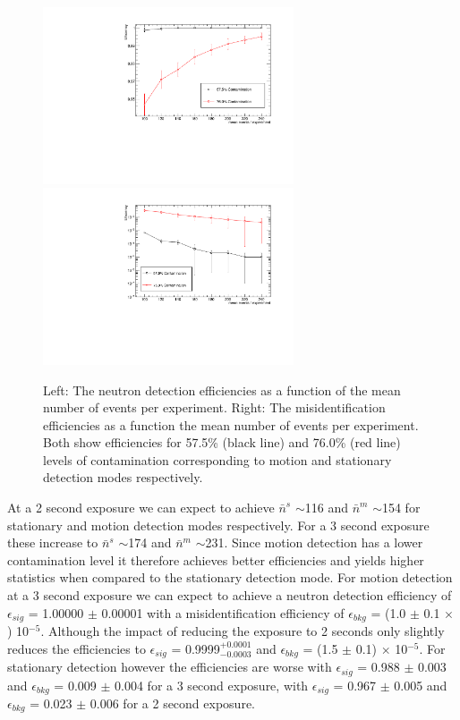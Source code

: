 \begin{figure}[htbp]
\begin{center}
\includegraphics[width=74mm]{Chapter8/figures/efficiencySignal_contaminationLevel_vs_events.pdf}
\includegraphics[width=74mm]{Chapter8/figures/misidentificationRate_contaminationLevel_vs_events.pdf}
\caption{Left: The neutron detection efficiencies as a function of the mean number of events per experiment. Right: The misidentification efficiencies as a function the mean number of events per experiment. Both show efficiencies for 57.5\% (black line) and 76.0\% (red line) levels of contamination corresponding to motion and stationary detection modes respectively.}
\label{fig:modesContaminationEffVsEvents}
\end{center}
\end{figure}

At a 2 second exposure we can expect to achieve $\bar{n}^{s}$ $\sim$116 and $\bar{n}^{m}$ $\sim$154 for stationary and motion detection modes respectively. For a 3 second exposure these increase to $\bar{n}^{s}$ $\sim$174 and $\bar{n}^{m}$ $\sim$231. Since motion detection has a lower contamination level it therefore achieves better efficiencies and yields higher statistics when compared to the stationary detection mode. For motion detection at a 3 second exposure we can expect to achieve a neutron detection efficiency of $\epsilon_{sig}$ = 1.00000 $\pm$ 0.00001 with a misidentification efficiency of $\epsilon_{bkg}$ = (1.0 $\pm$ 0.1 $\times$) 10$^{-5}$. Although the impact of reducing the exposure to 2 seconds only slightly reduces the efficiencies to $\epsilon_{sig}$ = 0.9999$^{+ 0.0001}_{-0.0003}$ and $\epsilon_{bkg}$ = (1.5 $\pm$ 0.1) $\times$ 10$^{-5}$. For stationary detection however the efficiencies are worse with $\epsilon_{sig}$ = 0.988 $\pm$ 0.003 and $\epsilon_{bkg}$ = 0.009 $\pm$ 0.004 for a 3 second exposure, with $\epsilon_{sig}$ = 0.967 $\pm$ 0.005 and $\epsilon_{bkg}$ = 0.023 $\pm$ 0.006 for a 2 second exposure. 

